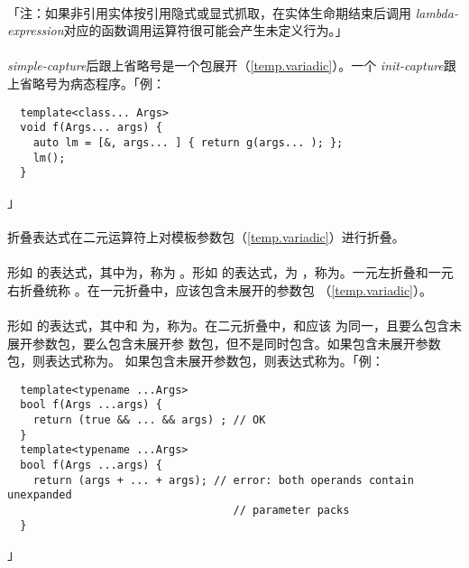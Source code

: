\paragraph{}
「注：如果非引用实体按引用隐式或显式抓取，在实体生命期结束后调用
\textit{lambda-expression}对应的函数调用运算符很可能会产生未定义行为。」

\paragraph{}
\textit{simple-capture}后跟上省略号是一个包展开（\ref{temp.variadic}）。一个
\textit{init-capture}跟上省略号为病态程序。「例：
\begin{lstlisting}
  template<class... Args>
  void f(Args... args) {
    auto lm = [&, args... ] { return g(args... ); };
    lm();
  }
\end{lstlisting}」


\paragraph{}
折叠表达式在二元运算符上对模板参数包（\ref{temp.variadic}）进行折叠。

  \synprd{\tm{+\ \ -\ \ *\ \ /\ \ \%\ \ \^\ \ \&\ \ |\ \ \tl{}\tl\ \ \tg{}\tg}}
  \synprd{\tm{+= -= *= /= \%= \^{}= \&= |= \tl{}\tl= \tg{}\tg= =}}

\paragraph{}
形如 的表达式，其中为，称为
。形如 的表达式，为
，称为。一元左折叠和一元右折叠统称
。在一元折叠中，应该包含未展开的参数包
（\ref{temp.variadic}）。

\paragraph{}
形如    的表达式，其中和
为，称为。在二元折叠中，和应该
为同一，且要么包含未展开参数包，要么包含未展开参
数包，但不是同时包含。如果包含未展开参数包，则表达式称为。
如果包含未展开参数包，则表达式称为。「例：
\begin{lstlisting}
  template<typename ...Args>
  bool f(Args ...args) {
    return (true && ... && args) ; // OK
  }
  template<typename ...Args>
  bool f(Args ...args) {
    return (args + ... + args); // error: both operands contain unexpanded
                                   // parameter packs
  }
\end{lstlisting}」


